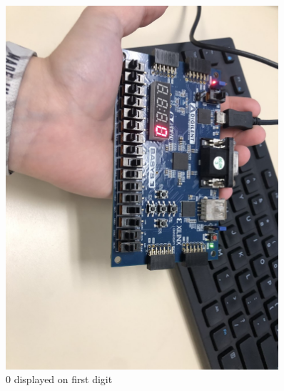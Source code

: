 \documentclass[11pt]{article}
\begin{document}
\begin{figure}[ht]\centering 
	\includegraphics[width= 0.9\textwidth]{b5.png}
	\caption{0 displayed on first digit}
	\label{fig: pic5}
\end{figure}
\end{document}

